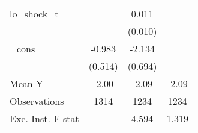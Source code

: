 {\begin{tabular}{l*{3}{c}}
\addlinespace
lo\_shock\_t  &                     &       0.011         &                     \\
            &                     &     (0.010)         &                     \\
\addlinespace
\_cons      &      -0.983\sym{*}  &      -2.134\sym{***}&                     \\
            &     (0.514)         &     (0.694)         &                     \\
\midrule
Mean Y      &       -2.00         &       -2.09         &       -2.09         \\
Observations&        1314         &        1234         &        1234         \\
Exc. Inst. F-stat&                     &       4.594         &       1.319         \\
\bottomrule
\end{tabular}
}
